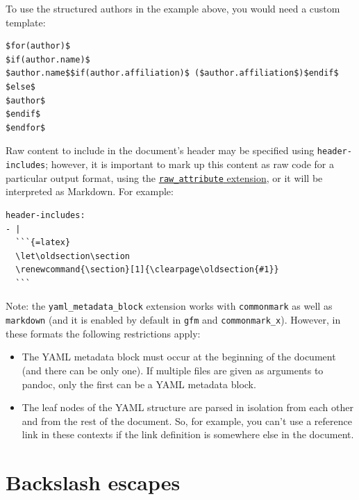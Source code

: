 \documentclass[
  b5paper
]{book}
\begin{document}
To use the structured authors in the example above, you would need a
custom template:

\begin{verbatim}
$for(author)$
$if(author.name)$
$author.name$$if(author.affiliation)$ ($author.affiliation$)$endif$
$else$
$author$
$endif$
$endfor$
\end{verbatim}

Raw content to include in the document's header may be specified using
\texttt{header-includes}; however, it is important to mark up this
content as raw code for a particular output format, using the
\hyperref[extension-raw_attribute]{\texttt{raw\_attribute} extension},
or it will be interpreted as Markdown. For example:

\begin{verbatim}
header-includes:
- |
  ```{=latex}
  \let\oldsection\section
  \renewcommand{\section}[1]{\clearpage\oldsection{#1}}
  ```
\end{verbatim}

Note: the \texttt{yaml\_metadata\_block} extension works with
\texttt{commonmark} as well as \texttt{markdown} (and it is enabled by
default in \texttt{gfm} and \texttt{commonmark\_x}). However, in these
formats the following restrictions apply:

\begin{itemize}
\item
  The YAML metadata block must occur at the beginning of the document
  (and there can be only one). If multiple files are given as arguments
  to pandoc, only the first can be a YAML metadata block.
\item
  The leaf nodes of the YAML structure are parsed in isolation from each
  other and from the rest of the document. So, for example, you can't
  use a reference link in these contexts if the link definition is
  somewhere else in the document.
\end{itemize}

\section{Backslash escapes}\label{backslash-escapes}
\end{document}
